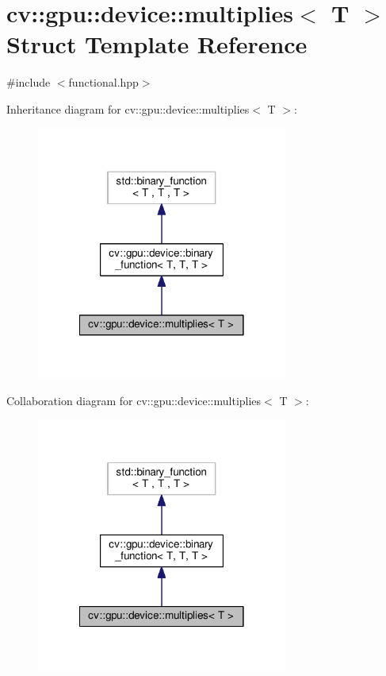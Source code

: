 \hypertarget{structcv_1_1gpu_1_1device_1_1multiplies}{\section{cv\-:\-:gpu\-:\-:device\-:\-:multiplies$<$ T $>$ Struct Template Reference}
\label{structcv_1_1gpu_1_1device_1_1multiplies}
}


{\ttfamily \#include $<$functional.\-hpp$>$}



Inheritance diagram for cv\-:\-:gpu\-:\-:device\-:\-:multiplies$<$ T $>$\-:\nopagebreak
\begin{figure}[H]
\begin{center}
\leavevmode
\includegraphics[width=234pt]{structcv_1_1gpu_1_1device_1_1multiplies__inherit__graph}
\end{center}
\end{figure}


Collaboration diagram for cv\-:\-:gpu\-:\-:device\-:\-:multiplies$<$ T $>$\-:\nopagebreak
\begin{figure}[H]
\begin{center}
\leavevmode
\includegraphics[width=234pt]{structcv_1_1gpu_1_1device_1_1multiplies__coll__graph}
\end{center}
\end{figure}
